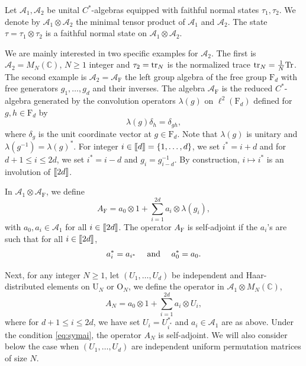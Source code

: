 \documentclass[11pt]{article}
\renewcommand{\star}{{\mathrm{F}}}
\newcommand{\cA}{\mathcal{A}}
\newcommand{\tr}{{\rm tr}}
\newcommand{\Tr}{{\rm Tr}}
\newcommand{\dF}{\mathrm{F}}
\newcommand{\dU}{\mathrm {U}}
\newcommand{\dO}{\mathrm{O}}
\newcommand{\dC}{\mathbb {C}}
\newcommand{\1}{1\!\!{\sf I}}
\newcommand{\INT}[1]{{{\left[\hspace{-1.4pt}\left[#1\right]\hspace{-1.4pt}\right]}}}
\begin{document}
\label{sec:model}

Let $\cA_1,\cA_2$ be unital $C^*$-algebras equipped with faithful normal   states $\tau_1,\tau_2$. We denote by $\cA_1 \otimes  \cA_2$ the minimal tensor product of $\cA_1$ and $\cA_2$.  The state $\tau = \tau_1 \otimes \tau_2$ is a faithful normal   state on $\cA_1 \otimes \cA_2$.

We are mainly interested in two specific examples for $\cA_2$. The first is $\cA_2 = M_N(\dC)$, $N \geq 1$ integer and $\tau_2 = \tr_N$ is the normalized trace $\tr_N = \frac 1 N \Tr$. The second example is $\cA_2 = \cA_{\star}$ the left group algebra of the free group $\dF_d$ with free generators $g_1, \ldots ,g_d$ and their inverses. The algebra $\cA_\star$ is the reduced $C^*$-algebra generated by the convolution operators $\lambda(g)$ on $\ell^2(\dF_d)$ defined for $g ,h \in \dF_d$ by
$$
\lambda(g) \delta_h = \delta_{gh},
$$
where $\delta_g$ is the unit coordinate vector at $g \in \dF_d$. Note that $\lambda(g)$ is unitary and $\lambda(g^{-1}) = \lambda(g)^*$. For  integer $i \in  \INT{d} = \{1,\ldots , d\}$, we set $i^* = i+d$ and for $d+1 \leq i \leq 2d$, we set $i^* = i-d$ and $g_{i} = g_{i - d}^{-1}$. By construction, $i \mapsto i^* $ is an involution of $\INT{2d}$.

In $\cA_1 \otimes \cA_\star$, we define 
\begin{equation}\label{eq:defA*}
A_\star = a_0 \otimes 1  + \sum_{i=1}^{2d} a_i \otimes \lambda(g_i),
\end{equation}
with $a_0, a_i \in \cA_1$ for all $i \in \INT{2d}$. The operator $A_\star$ is self-adjoint if the $a_i$'s are such that for all $i \in \INT{2d}$, 
\begin{equation}\label{eq:symai}
a_i ^ * = a_{i^*} \quad \hbox{ and } \quad a_0^* = a_0.
\end{equation}

Next, for any integer $N \geq 1$, let $(U_1,\ldots, U_d)$ be independent and Haar-distributed elements on $\dU_N$ or $\dO_N$, we define the operator in $\cA_1 \otimes M_N(\dC)$,
\begin{equation}\label{eq:defA}
A_N = a_0 \otimes 1  + \sum_{i=1}^{2d} a_i \otimes U_i,
\end{equation}
where for $d +1 \leq i \leq 2d$, we have set $U_{i} = U_{i^*}^*$ and $a_i \in \cA_1$ are as above. Under the condition  \eqref{eq:symai}, the operator $A_N$ is self-adjoint. We will also consider below the case when $(U_1,\ldots,U_d)$ are independent uniform permutation matrices of size $N$.
\end{document}
